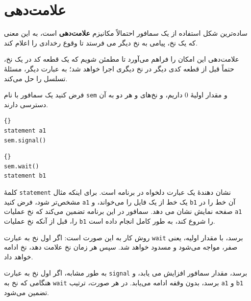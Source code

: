 \documentclass{book}
\begin{document}
\section{علامت‌دهی}

ساده‌ترین شکل استفاده از یک سمافور احتمالاً مکانیزم \textbf{علامت‌دهی}  است، 
به این معنی که یک نخ، پیامی به نخ دیگر می فرستد تا وقوع رخدادی را اعلام کند.

علامت‌دهی این امکان را فراهم می‌آورد تا مطمئن شویم که یک قطعه کد در یک نخ، حتماً قبل از قطعه کدی دیگر در نخ دیگری اجرا خواهد شد؛ به عبارت دیگر، مسئلهٔ تسلسل را حل می‌کند.

فرض کنید یک سمافور با نام \texttt{sem} و مقدار اولیهٔ  $0$ داریم، و نخ‌های  و  هر دو به آن دسترسی دارند.

\begin{latin}
\begin{minipage}[t]{2in}
\begin{latin}
\begin{lstlisting}[title=\rl{نخ \lr{A}}]{}
statement a1
sem.signal()
\end{lstlisting}
\end{latin}
\end{minipage}
\hfill
\begin{minipage}[t]{2in}
\begin{latin}
\begin{lstlisting}[title=\rl{نخ \lr{B}}]{}
sem.wait()
statement b1
\end{lstlisting}
\end{latin}
\end{minipage}
\end{latin}

کلمهٔ \texttt{statement} نشان دهندهٔ یک عبارت دلخواه در برنامه است. برای اینکه مثال مشخص‌تر شود، فرض کنید \texttt{a1}
یک خط از یک فایل را می‌خواند، و \texttt{b1} آن خط را در صفحه نمایش نشان می دهد. سمافور در این برنامه تضمین می‌کند که 
نخ  عملیات \texttt{a1} را، قبل از آنکه نخ  عملیات \texttt{b1} را شروع کند، به طور کامل انجام داده است.

روش کار به این صورت است: اگر اول نخ  به عبارت \texttt{wait} برسد، با مقدار اولیه، یعنی صفر، مواجه می‌شود 
و مسدود خواهد شد. سپس هر زمان نخ  علامت دهد، نخ  ادامه خواهد داد.

به طور مشابه، اگر اول نخ  به عبارت \texttt{signal} برسد، مقدار سمافور افزایش می یابد، و هنگامی که نخ  
به \texttt{wait} برسد، بدون وقفه ادامه می‌یابد. در هر صورت، ترتیب \texttt{a1} و \texttt{b1} تضمین می‌شود.
\end{document}
